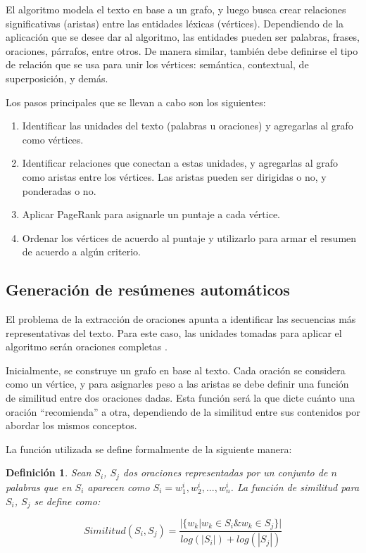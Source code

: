 \documentclass{llncs}
\newtheorem{definicion}{Definición}
\begin{document}
El algoritmo modela el texto en base a un grafo, y luego busca crear relaciones significativas (aristas) entre las entidades léxicas (vértices). Dependiendo de la aplicación que se desee dar al algoritmo, las entidades pueden ser palabras, frases, oraciones, párrafos, entre otros. De manera similar, también debe definirse el tipo de relación que se usa para unir los vértices: semántica, contextual, de superposición, y demás.

Los pasos principales que se llevan a cabo son los siguientes:

\begin{enumerate}
\item Identificar las unidades del texto (palabras u oraciones) y agregarlas al grafo como vértices.
\item Identificar relaciones que conectan a estas unidades, y agregarlas al grafo como aristas entre los vértices. Las aristas pueden ser dirigidas o no, y ponderadas o no.
\item Aplicar PageRank para asignarle un puntaje a cada vértice.
\item Ordenar los vértices de acuerdo al puntaje y utilizarlo para armar el resumen de acuerdo a algún criterio.
\end{enumerate}

\subsection{Generación de resúmenes automáticos}
El problema de la extracción de oraciones apunta a identificar las secuencias más representativas del texto. Para este caso, las unidades tomadas para aplicar el algoritmo serán oraciones completas \cite{introductionir}.

Inicialmente, se construye un grafo en base al texto. Cada oración se considera como un vértice, y para asignarles peso a las aristas se debe definir una función de similitud entre dos oraciones dadas. Esta función será la que dicte cuánto una oración “recomienda” a otra, dependiendo de la similitud entre sus contenidos por abordar los mismos conceptos.
    
La función utilizada se define formalmente de la siguiente manera:


\begin{definicion}
Sean $S_i$, $S_j$ dos oraciones representadas por un conjunto de $n$ palabras que en 
$S_i$ aparecen como $S_i = w_{1}^{i}, w_{2}^{i},..., w_{n}^{i}$. La función de similitud para $S_i$, $S_j$ se define como:


\begin{equation}
Similitud(S_{i},S_{j}) = \frac{ | \{   w_{k} | w_{k} \in S_{i} \& w_{k} \in S_{j}   \}  | }    
                              {  log(|S_{i}|) + log(|S_{j}|)  }
\end{equation}


\end{definicion}
    
\end{document}
